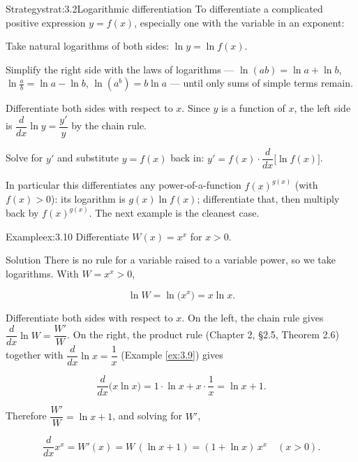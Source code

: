 \documentclass[a4paper,12pt,oneside]{memoir}
\begin{document}
\begin{envstrategy}{Strategy}{strat:3.2}{Logarithmic differentiation}
To differentiate a complicated positive expression \(y = f(x)\), especially one with the variable in an exponent:

\begin{steps}
  \item Take natural logarithms of both sides: \(\ln y = \ln f(x)\).
  \item Simplify the right side with the laws of logarithms — \(\ln(ab) = \ln a + \ln b\), \(\ln\frac{a}{b} = \ln a - \ln b\), \(\ln(a^{b}) = b\ln a\) — until only sums of simple terms remain.
  \item Differentiate both sides with respect to \(x\). Since \(y\) is a function of \(x\), the left side is \(\dfrac{d}{dx}\ln y = \dfrac{y'}{y}\) by the chain rule.
  \item Solve for \(y'\) and substitute \(y = f(x)\) back in: \(y' = f(x)\cdot\dfrac{d}{dx}\bigl[\ln f(x)\bigr]\).
\end{steps}
In particular this differentiates any power-of-a-function \(f(x)^{g(x)}\) (with \(f(x) > 0\)): its logarithm is \(g(x)\ln f(x)\); differentiate that, then multiply back by \(f(x)^{g(x)}\). The next example is the cleanest case.
\end{envstrategy}
\begin{workedexample}
\begin{envexample}{Example}{ex:3.10}{}
Differentiate \(W(x) = x^{x}\) for \(x > 0\).
\end{envexample}
\begin{envsolution}{Solution}{}{}
There is no rule for a variable raised to a variable power, so we take logarithms. With \(W = x^{x} > 0\),

\[ \ln W = \ln\bigl(x^{x}\bigr) = x\ln x. \]

Differentiate both sides with respect to \(x\). On the left, the chain rule gives \(\dfrac{d}{dx}\ln W = \dfrac{W'}{W}\). On the right, the product rule (Chapter 2, §2.5, Theorem 2.6) together with \(\dfrac{d}{dx}\ln x = \dfrac{1}{x}\) (Example \ref{ex:3.9}) gives

\[ \frac{d}{dx}\bigl(x\ln x\bigr) = 1\cdot\ln x + x\cdot\frac{1}{x} = \ln x + 1. \]

Therefore \(\dfrac{W'}{W} = \ln x + 1\), and solving for \(W'\),

\[ \frac{d}{dx}x^{x} = W'(x) = W\,(\ln x + 1) = (1 + \ln x)\,x^{x} \quad (x > 0). \]
\end{envsolution}
\end{workedexample}
\end{document}

